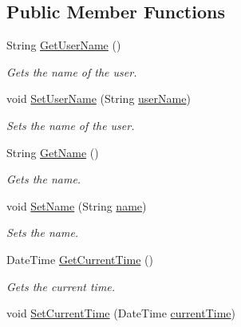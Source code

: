 \subsection*{Public Member Functions}
\begin{DoxyCompactItemize}
\item 
String \hyperlink{classcom_1_1shephertz_1_1app42_1_1paas_1_1sdk_1_1csharp_1_1timer_1_1_timer_ac6806170727203d81edb8703dc50373a}{Get\+User\+Name} ()
\begin{DoxyCompactList}\small\item\em Gets the name of the user. \end{DoxyCompactList}\item 
void \hyperlink{classcom_1_1shephertz_1_1app42_1_1paas_1_1sdk_1_1csharp_1_1timer_1_1_timer_ab39eacfe442df40ee850a946ac060941}{Set\+User\+Name} (String \hyperlink{classcom_1_1shephertz_1_1app42_1_1paas_1_1sdk_1_1csharp_1_1timer_1_1_timer_a07a192f4cffc6645d5697f986ce710de}{user\+Name})
\begin{DoxyCompactList}\small\item\em Sets the name of the user. \end{DoxyCompactList}\item 
String \hyperlink{classcom_1_1shephertz_1_1app42_1_1paas_1_1sdk_1_1csharp_1_1timer_1_1_timer_a5b8a011ea0f9b6cc8ac07366164ee36d}{Get\+Name} ()
\begin{DoxyCompactList}\small\item\em Gets the name. \end{DoxyCompactList}\item 
void \hyperlink{classcom_1_1shephertz_1_1app42_1_1paas_1_1sdk_1_1csharp_1_1timer_1_1_timer_a01f090bf75708336b0112795d3ce65bb}{Set\+Name} (String \hyperlink{classcom_1_1shephertz_1_1app42_1_1paas_1_1sdk_1_1csharp_1_1timer_1_1_timer_aae87b9667c3ecc5e46afcb073be757a6}{name})
\begin{DoxyCompactList}\small\item\em Sets the name. \end{DoxyCompactList}\item 
Date\+Time \hyperlink{classcom_1_1shephertz_1_1app42_1_1paas_1_1sdk_1_1csharp_1_1timer_1_1_timer_a39696874137af27cba74bb22eea8c5f9}{Get\+Current\+Time} ()
\begin{DoxyCompactList}\small\item\em Gets the current time. \end{DoxyCompactList}\item 
void \hyperlink{classcom_1_1shephertz_1_1app42_1_1paas_1_1sdk_1_1csharp_1_1timer_1_1_timer_ac58602df4798bf87b9a5d22790dbe8d4}{Set\+Current\+Time} (Date\+Time \hyperlink{classcom_1_1shephertz_1_1app42_1_1paas_1_1sdk_1_1csharp_1_1timer_1_1_timer_a2fc22d08c6ae6f30d4cfd6315077392d}{current\+Time})

\end{DoxyCompactItemize}
